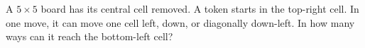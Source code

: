 A $5\times5$ board has its central cell removed. A token starts in the top-right cell. In one move, it can move one cell left, down, or diagonally down-left. In how many ways can it reach the bottom-left cell?
